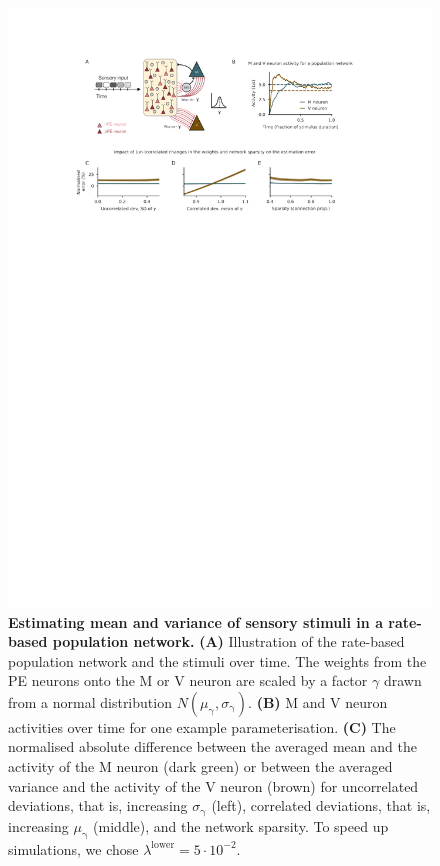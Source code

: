 \documentclass[10pt,a4paper]{article}
\begin{document}
\begin{figure}[!h]
	\centering
    \includegraphics{../results/figures/final/Fig_2_S2.pdf}%
\caption{\footnotesize{\bf Estimating mean and variance of sensory stimuli in a rate-based population network.\newline}  
{\bf (A)} Illustration of the rate-based population network and the stimuli over time. The weights from the PE neurons onto the M or V neuron are scaled by a factor $\gamma$ drawn from a normal distribution $N(\mu_\mathrm{\gamma}, \sigma_\mathrm{\gamma})$.
{\bf (B)} M and V neuron activities over time for one example parameterisation.
{\bf (C)} The normalised absolute difference between the averaged mean and the activity of the M neuron (dark green) or between the averaged variance and the activity of the V neuron (brown) for uncorrelated deviations, that is, increasing $\sigma_\mathrm{\gamma}$ (left), correlated deviations, that is, increasing $\mu_\mathrm{\gamma}$ (middle), and the network sparsity. To speed up simulations, we chose $\lambda^\mathrm{lower}=5\cdot 10^{-2}$.
}
\label{fig:Fig_2_S2}
\end{figure}
\end{document}
